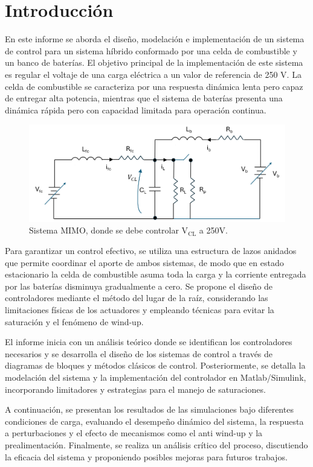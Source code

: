 \section{Introducción}
En este informe se aborda el diseño, modelación e implementación de un sistema de control para un sistema híbrido conformado por una celda de combustible y un banco de baterías. El objetivo principal de la implementación de este sistema es regular el voltaje de una carga eléctrica a un valor de referencia de 250 V. La celda de combustible se caracteriza por una respuesta dinámica lenta pero capaz de entregar alta potencia, mientras que el sistema de baterías presenta una dinámica rápida pero con capacidad limitada para operación continua.

\begin{figure}
    \centering
    \includegraphics[width=0.7\linewidth]{img/circuito.png}
    \caption{Sistema MIMO, donde se debe controlar V$_{\text{CL}}$ a 250V.}
    \label{fig:circuito}
\end{figure}

Para garantizar un control efectivo, se utiliza una estructura de lazos anidados que permite coordinar el aporte de ambos sistemas, de modo que en estado estacionario la celda de combustible asuma toda la carga y la corriente entregada por las baterías disminuya gradualmente a cero. Se propone el diseño de controladores mediante el método del lugar de la raíz, considerando las limitaciones físicas de los actuadores y empleando técnicas para evitar la saturación y el fenómeno de wind-up.

El informe inicia con un análisis teórico donde se identifican los controladores necesarios y se desarrolla el diseño de los sistemas de control a través de diagramas de bloques y métodos clásicos de control. Posteriormente, se detalla la modelación del sistema y la implementación del controlador en Matlab/Simulink, incorporando limitadores y estrategias para el manejo de saturaciones.

A continuación, se presentan los resultados de las simulaciones bajo diferentes condiciones de carga, evaluando el desempeño dinámico del sistema, la respuesta a perturbaciones y el efecto de mecanismos como el anti wind-up y la prealimentación. Finalmente, se realiza un análisis crítico del proceso, discutiendo la eficacia del sistema y proponiendo posibles mejoras para futuros trabajos.
